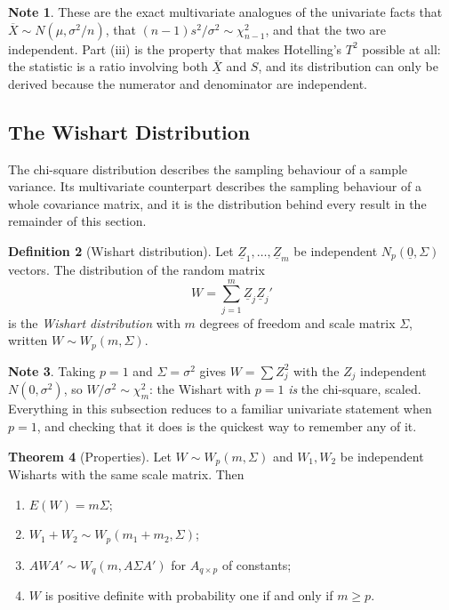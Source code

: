 \documentclass[11pt,a4paper]{article}
\theoremstyle{definition}
\newtheorem{thm}{Theorem}[section]
\newtheorem{defn}[thm]{Definition}
\newtheorem{note}[thm]{Note}
\begin{document}
\begin{note}
These are the exact multivariate analogues of the univariate facts that
$\overline{X}\sim N(\mu,\sigma^{2}/n)$, that $(n-1)s^{2}/\sigma^{2}\sim\chi^{2}_{n-1}$,
and that the two are independent. Part (iii) is the property that makes
Hotelling's $T^{2}$ possible at all: the statistic is a ratio involving both
$\overline{\underline{X}}$ and $S$, and its distribution can only be derived
because the numerator and denominator are independent.
\end{note}

\subsection{The Wishart Distribution}

The chi-square distribution describes the sampling behaviour of a sample
variance. Its multivariate counterpart describes the sampling behaviour of a
whole covariance matrix, and it is the distribution behind every result in the
remainder of this section.

\begin{defn}[Wishart distribution]
Let $\underline{Z}_1,\dots,\underline{Z}_m$ be independent
$N_p(\underline{0},\Sigma)$ vectors. The distribution of the random matrix
$$W = \sum^{m}_{j=1}\underline{Z}_j\underline{Z}_j'$$
is the \emph{Wishart distribution} with $m$ degrees of freedom and scale matrix
$\Sigma$, written $W\sim W_p(m,\Sigma)$.
\end{defn}

\begin{note}
Taking $p=1$ and $\Sigma=\sigma^{2}$ gives $W = \sum Z_j^{2}$ with the $Z_j$
independent $N(0,\sigma^{2})$, so $W/\sigma^{2}\sim\chi^{2}_{m}$: the Wishart
with $p=1$ \emph{is} the chi-square, scaled. Everything in this subsection
reduces to a familiar univariate statement when $p=1$, and checking that it does
is the quickest way to remember any of it.
\end{note}

\begin{thm}[Properties]
\label{thm:wishart}
Let $W\sim W_p(m,\Sigma)$ and $W_1, W_2$ be independent Wisharts with the same
scale matrix. Then
\begin{enumerate}
\item[(i)] $E(W) = m\Sigma$;
\item[(ii)] $W_1 + W_2 \sim W_p\left(m_1+m_2,\Sigma\right)$;
\item[(iii)] $AWA' \sim W_q\left(m, A\Sigma A'\right)$ for $A_{q\times p}$ of constants;
\item[(iv)] $W$ is positive definite with probability one if and only if
$m\geq p$.
\end{enumerate}
\end{thm}
\end{document}
